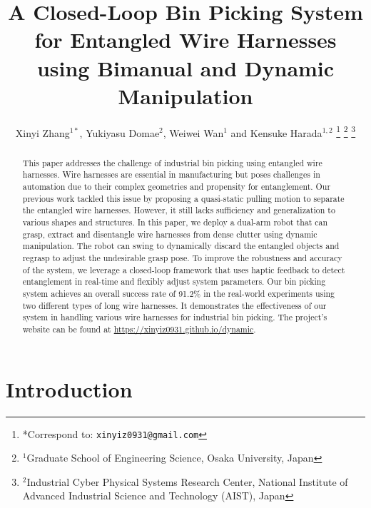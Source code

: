 \documentclass[letterpaper, 10 pt, conference]{ieeeconf}
\title{\LARGE \bf
A Closed-Loop Bin Picking System for Entangled Wire Harnesses\\using Bimanual and Dynamic Manipulation
}
\author{Xinyi Zhang$^{1*}$, 
Yukiyasu Domae$^{2}$, Weiwei Wan$^{1}$ and Kensuke Harada$^{1,2}$%
\thanks{*Correspond to: {\tt\small xinyiz0931@gmail.com}}%
\thanks{$^{1}$Graduate School of Engineering Science, Osaka University, Japan}%
\thanks{$^{2}$Industrial Cyber Physical Systems Research Center, National Institute of Advanced Industrial Science and Technology (AIST), Japan}
}
\newcommand{\magenta}[1]{\textcolor{magenta}{#1}}
\begin{document}
\maketitle
\thispagestyle{empty}
\pagestyle{empty}

\begin{abstract}
    This paper addresses the challenge of industrial bin picking using entangled wire harnesses. Wire harnesses are essential in manufacturing but poses challenges in automation due to their complex geometries and propensity for entanglement. Our previous work tackled this issue by proposing a quasi-static pulling motion to separate the entangled wire harnesses. However, it still lacks sufficiency and generalization to various shapes and structures. In this paper, we deploy a dual-arm robot that can grasp, extract and disentangle wire harnesses from dense clutter using dynamic manipulation. The robot can swing to dynamically discard the entangled objects and regrasp to adjust the undesirable grasp pose. To improve the robustness and accuracy of the system, we leverage a closed-loop framework that uses haptic feedback to detect entanglement in real-time and flexibly adjust system parameters. Our bin picking system achieves an overall success rate of 91.2\% in the real-world experiments using two different types of long wire harnesses. It demonstrates the effectiveness of our system in handling various wire harnesses for industrial bin picking. The project’s website can be found at \magenta{\url{https://xinyiz0931.github.io/dynamic}}. 
\end{abstract}


\section{Introduction}
\label{sec:intro}
\end{document}

